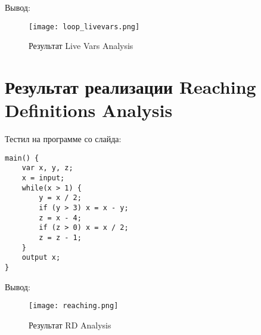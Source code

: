 \documentclass{report}
\begin{document}
Вывод:
\begin{figure}
    \centering
    \texttt{[image: loop\_livevars.png]}
    \caption{Результат Live Vars Analysis}
    \label{fig:enter-label}
\end{figure}

\section{Результат реализации Reaching Definitions Analysis}

Тестил на программе со слайда:
\begin{lstlisting}
main() {
    var x, y, z;
    x = input;
    while(x > 1) {
        y = x / 2;
        if (y > 3) x = x - y;
        z = x - 4;
        if (z > 0) x = x / 2;
        z = z - 1;
    }
    output x;
}
\end{lstlisting}

Вывод:
\begin{figure}
    \centering
    \texttt{[image: reaching.png]}
    \caption{Результат RD Analysis}
    \label{fig:enter-label}
\end{figure}
\end{document}
